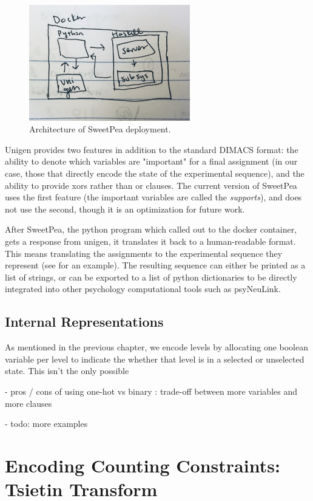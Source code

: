 \begin{figure}[t]
    \centerline{\includegraphics[origin=c,width=7cm]{fig_architecture}}
    \caption{Architecture of SweetPea deployment.}%
    \label{fig:fig_architecture}%
\end{figure}

Unigen provides two features in addition to the standard DIMACS format: the ability to denote which variables are "important" for a final assignment (in our case, those that directly encode the state of the experimental sequence), and the ability to provide xors rather than or clauses. The current version of SweetPea uses the first feature (the important variables are called the \emph{supports}), and does not use the second, though it is an optimization for future work.

After SweetPea, the python program which called out to the docker container, gets a response from unigen, it translates it back to a human-readable format. This means translating the assignments to the experimental sequence they represent (see  for an example). The resulting sequence can either be printed as a list of strings, or can be exported to a list of python dictionaries to be directly integrated into other psychology computational tools such as psyNeuLink.

\subsection{Internal Representations}

As mentioned in the previous chapter, we encode levels by allocating one boolean variable per level to indicate the whether that level is in a selected or unselected state. This isn't the only possible


- pros / cons of using one-hot vs binary : trade-off between more variables and more clauses

- todo: more examples

\section{Encoding Counting Constraints: Tsietin Transform}

